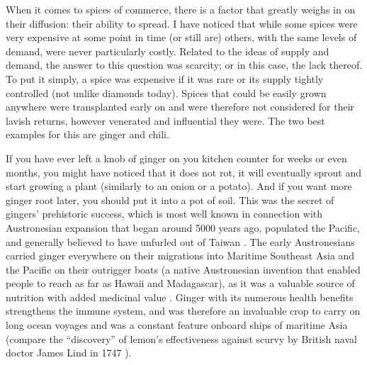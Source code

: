 When it comes to spices of commerce, there is a factor that greatly weighs in on their diffusion: their ability to spread. I have noticed that while some spices were very expensive at some point in time (or still are) others, with the same levels of demand, were never particularly costly. Related to the ideas of supply and demand, the answer to this question was scarcity; or in this case, the lack thereof. To put it simply, a spice was expensive if it was rare or its supply tightly controlled (not unlike diamonds today). Spices that could be easily grown anywhere were transplanted early on and were therefore not considered for their lavish returns, however venerated and influential they were. The two best examples for this are ginger and chili. 

If you have ever left a knob of ginger on you kitchen counter for weeks or even months, you might have noticed that it does not rot, it will eventually sprout and start growing a plant (similarly to an onion or a potato). And if you want more ginger root later, you should put it into a pot of soil. This was the secret of gingers' prehistoric success, which is most well known in connection with Austronesian expansion that began around 5000 years ago, populated the Pacific, and generally believed to have unfurled out of Taiwan \autocite{mirabal_ascertaining_2013}. The early Austronesians carried ginger everywhere on their migrations into Maritime Southeast Asia and the Pacific on their outrigger boats (a native Austronesian invention that enabled people to reach as far as Hawaii and Madagascar), as it was a valuable source of nutrition with added medicinal value \autocite[see][21-25]{dalby_dangerous_2000}. Ginger with its numerous health benefits strengthens the immune system, and was therefore an invaluable crop to carry on long ocean voyages and was a constant feature onboard ships of maritime Asia (compare the ``discovery'' of lemon's effectiveness against scurvy by British naval doctor James Lind in 1747 \autocite{allan_finding_2021}).

